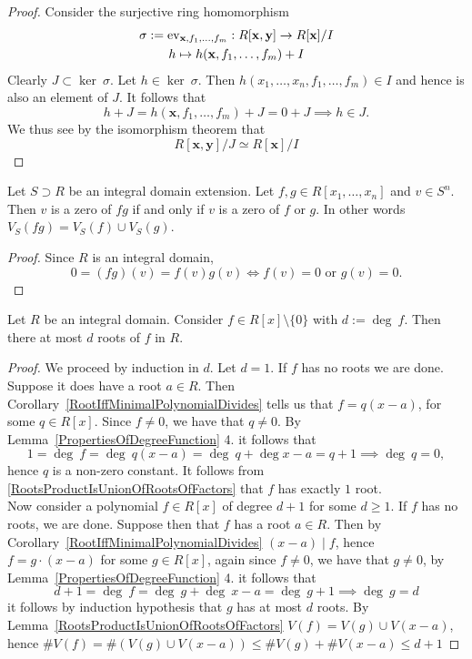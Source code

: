 \begin{proof}
    Consider the surjective ring homomorphism
    \begin{gather*}
        \sigma := \mathrm{ev}_{\mathbf{x},f_1,\dots,f_m} : R[\mathbf{x},\mathbf{y}]\rightarrow R[\mathbf{x}]/I\\
        h \mapsto h(\mathbf{x},f_1,\dots,f_m) + I 
    \end{gather*}
    Clearly $J\subset \ker \ \sigma$. Let $h \in \ker\ \sigma$. Then $h(x_1,\dots,x_n,f_1,\dots,f_m)\in I$ and hence is also an element of $J$. It follows that
    $$h + J = h(\mathbf{x},f_1,\dots,f_m) + J = 0 + J\implies h\in J.$$
    We thus see by the isomorphism theorem that 
    $$R[\mathbf{x},\mathbf{y}]/J \simeq R[\mathbf{x}]/I$$
\end{proof}
\begin{lemma}\label{RootsProductIsUnionOfRootsOfFactors}
    Let $S\supset R$ be an integral domain extension. Let $f,g\in R[x_1,\dots,x_n]$ and $v\in S^n$. Then $v$ is a zero of $fg$ if and only if $v$ is a zero of $f$ or $g$. In other words $V_S(fg)=V_S(f)\cup V_S(g)$.
\end{lemma}
\begin{proof}
    Since $R$ is an integral domain,
    $$0 = (fg)(v) = f(v)g(v) \iff f(v) = 0 \text{ or } g(v) = 0.$$
\end{proof}
\begin{proposition}\label{InIDNumberOfRootsBoundedByDegree}
    Let $R$ be an integral domain. Consider $f \in R[x]\setminus\{0\}$ with $d := \deg \ f$. Then there at most $d$ roots of $f$ in $R$.  
\end{proposition}
\begin{proof}
    We proceed by induction in $d$. Let $d = 1$. If $f$ has no roots we are done. Suppose it does have a root $a\in R$. Then Corollary~\ref{RootIffMinimalPolynomialDivides} tells us that $f = q(x-a)$, for some $q \in R[x]$. Since $f \neq 0$, we have that $q \neq 0$. By Lemma~\ref{PropertiesOfDegreeFunction} 4. it follows that
    $$1 = \deg \ f = \deg\ q(x-a) =\deg \ q + \deg x-a = q +1 \implies \deg \ q = 0,$$
    hence $q$ is a non-zero constant. It follows from \ref{RootsProductIsUnionOfRootsOfFactors} that $f$ has exactly $1$ root.\\
    Now consider a polynomial $f\in R[x]$ of degree $d+1$ for some $d\geq 1$. If $f$ has no roots, we are done. Suppose then that $f$ has a root $a\in R$. Then by Corollary~\ref{RootIffMinimalPolynomialDivides} $(x-a)\mid f$, hence $f = g\cdot(x-a)$ for some $g\in R[x]$, again since $f\neq 0$, we have that $g\neq 0$, by Lemma~\ref{PropertiesOfDegreeFunction} 4. it follows that 
    $$d+1 = \deg \ f = \deg \ g + \deg \ x-a = \deg \ g + 1 \implies \deg \ g = d$$
    it follows by induction hypothesis that $g$ has at most $d$ roots. By Lemma~\ref{RootsProductIsUnionOfRootsOfFactors} $V(f)=V(g)\cup V(x-a)$, hence $\#V(f) = \#\left(V(g)\cup V(x-a)\right)\leq \#V(g)+\#V(x-a)  \leq d + 1 $ 
\end{proof}
